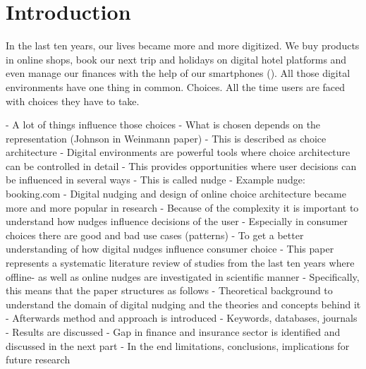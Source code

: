 \section{Introduction}
In the last ten years, our lives became more and more digitized. We buy products in online shops, book our next trip and holidays on digital hotel platforms and even manage our finances with the help of our smartphones (\cite{schneider_digital_2018}). All those digital environments have one thing in common. Choices. All the time users are faced with choices they have to take. 

-	A lot of things influence those choices
-	What is chosen depends on the representation (Johnson in Weinmann paper)
-	This is described as choice architecture
-	Digital environments are powerful tools where choice architecture can be controlled in detail
-	This provides opportunities where user decisions can be influenced in several ways
-	This is called nudge
-	Example nudge: booking.com
-	Digital nudging and design of online choice architecture became more and more popular in research
-	Because of the complexity it is important to understand how nudges influence decisions of the user
-	Especially in consumer choices there are good and bad use cases (patterns)
-	To get a better understanding of how digital nudges influence consumer choice
-	This paper represents a systematic literature review of studies from the last ten years where offline- as well as online nudges are investigated in scientific manner
-	Specifically, this means that the paper structures as follows
-	Theoretical background to understand the domain of digital nudging and the theories and concepts behind it
-	Afterwards method and approach is introduced
-	Keywords, databases, journals
-	Results are discussed
-	Gap in finance and insurance sector is identified and discussed in the next part
-	In the end limitations, conclusions, implications for future research
